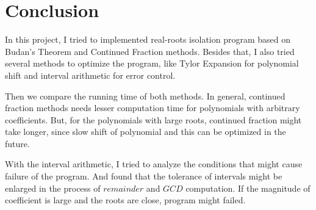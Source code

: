 \section{Conclusion}

In this project, I tried to implemented real-roots isolation program based on
Budan's Theorem and Continued Fraction methods. Besides that, I also tried
several methods to optimize the program, like Tylor Expansion for polynomial
shift and interval arithmetic for error control. 

Then we compare the running time of both methods. In general, continued fraction
methods needs lesser computation time for polynomials with arbitrary
coefficients. But, for the polynomials with large roots, continued fraction
might take longer, since slow shift of polynomial and this can be optimized in
the future. 

With the interval arithmetic, I tried to analyze the conditions that might
cause failure of the program. And found that the tolerance of intervals might be
enlarged in the process of $remainder$ and $GCD$ computation. If the magnitude
of coefficient is large and the roots are close, program might failed.
